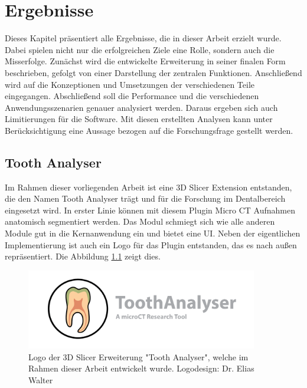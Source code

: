 \chapter{Ergebnisse}
\label{chap:ergebnisse} Dieses Kapitel präsentiert alle Ergebnisse, die in
dieser Arbeit erzielt wurde. Dabei spielen nicht nur die erfolgreichen Ziele eine
Rolle, sondern auch die Misserfolge. Zunächst wird die entwickelte Erweiterung in
seiner finalen Form beschrieben, gefolgt von einer Darstellung der zentralen
Funktionen. Anschließend wird auf die Konzeptionen und Umsetzungen der verschiedenen
Teile eingegangen. Abschließend soll die Performance und die verschiedenen
Anwendungsszenarien genauer analysiert werden. Daraus ergeben sich auch Limitierungen
für die Software. Mit diesen erstellten Analysen kann unter Berücksichtigung
eine Aussage bezogen auf die Forschungsfrage gestellt werden.

\section{Tooth Analyser}
\label{sec:tooth_analyser} Im Rahmen dieser vorliegenden Arbeit ist eine 3D
Slicer Extension entstanden, die den Namen Tooth Analyser trägt und für die Forschung
im Dentalbereich eingesetzt wird. In erster Linie können mit diesem Plugin Micro
CT Aufnahmen anatomisch segmentiert werden. Das Modul schmiegt sich wie alle anderen
Module gut in die Kernanwendung ein und bietet eine \ac{UI}. Neben der eigentlichen
Implementierung ist auch ein Logo für das Plugin entstanden, das es nach außen
repräsentiert. Die Abbildung \ref{fig:logo_tooth_analyser} zeigt dies.

\begin{figure}[h]
	\centering
	\includegraphics[width=0.9\textwidth]{img/SlicerToothAnalyser.png}
	\caption{Logo der 3D Slicer Erweiterung "Tooth Analyser", welche im Rahmen dieser
	Arbeit entwickelt wurde. Logodesign: Dr. Elias Walter}
	\label{fig:logo_tooth_analyser}
\end{figure}

